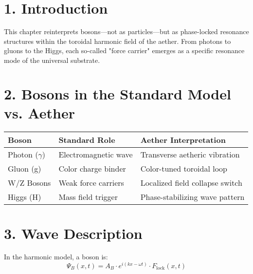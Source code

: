 \documentclass[12pt]{book}
\begin{document}





\maketitle

\section*{1. Introduction}

This chapter reinterprets bosons—not as particles—but as phase-locked resonance structures within the toroidal harmonic field of the aether. From photons to gluons to the Higgs, each so-called "force carrier" emerges as a specific resonance mode of the universal substrate.

\section*{2. Bosons in the Standard Model vs. Aether}

\begin{tabular}{|l|l|l|}
\hline
\textbf{Boson} & \textbf{Standard Role} & \textbf{Aether Interpretation} \\
\hline
Photon (\( \gamma \)) & Electromagnetic wave & Transverse aetheric vibration \\
Gluon (g) & Color charge binder & Color-tuned toroidal loop \\
W/Z Bosons & Weak force carriers & Localized field collapse switch \\
Higgs (H) & Mass field trigger & Phase-stabilizing wave pattern \\
\hline
\end{tabular}

\section*{3. Wave Description}

In the harmonic model, a boson is:
\[
\Psi_B(x, t) = A_B \cdot e^{i(kx - \omega t)} \cdot F_{\text{lock}}(x, t)
\]
\end{document}
